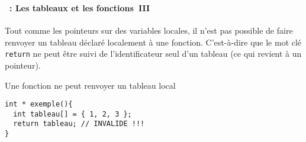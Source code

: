 \begin{frame}[containsverbatim]
  \frametitle{\secname}
  \framesubtitle{\subsecname~: Les tableaux et les fonctions~III}

  Tout comme les pointeurs sur des variables locales, il n'est pas possible de faire renvoyer un tableau déclaré localement à une
  fonction. C'est-à-dire que le mot clé \texttt{return} ne peut être suivi de l'identificateur seul d'un tableau (ce qui revient 
  à un pointeur).
  \vspace{0.5cm}
  \begin{exampleblock}{Une fonction ne peut renvoyer un tableau local}
    \begin{verbatim}
int * exemple(){
  int tableau[] = { 1, 2, 3 };
  return tableau; // INVALIDE !!!
}\end{verbatim}    
  \end{exampleblock}
\end{frame}

